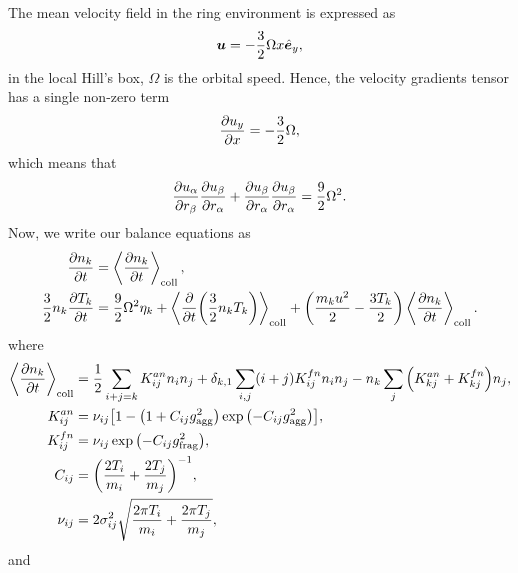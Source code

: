 \documentclass[aps,prl,preprint,groupedaddress,10pt]{revtex4-2}
\begin{document}
The mean velocity field in the ring environment is expressed as
\begin{equation}
    \vb*{u} = -\frac{3}{2}\Omega x\hat{\vb*{e}}_y,
\end{equation}
in the local Hill's box, $\Omega$ is the orbital speed.
Hence, the velocity gradients tensor has a single non-zero term
\begin{equation}
    \pdv{u_y}{x}=-\frac{3}{2}\Omega,
\end{equation}
which means that
\begin{equation}
    \pdv{{u}_{\alpha}}{{r}_{\beta}}\pdv{{u}_{\beta}}{{r}_{\alpha}}+\pdv{{u}_{\beta}}{{r}_{\alpha}}\pdv{{u}_{\beta}}{{r}_{\alpha}}=
    \frac{9}{2}\Omega^2.
\end{equation}
Now, we write our balance equations as
\begin{equation}
    \begin{split}
        \pdv{n_k}{t} &= \ltx{\avg{\pdv{n_k}{t}}}{coll},\\
        \frac{3}{2}n_k\pdv{T_k}{t} &=
        \frac{9}{2}\Omega^2\eta_k+
        \ltx{\avg{\pdv{t}\pqty{\frac{3}{2}n_kT_k}}}{coll}+
        \pqty{\frac{m_ku^2}{2}-\frac{3T_k}{2}}\ltx{\avg{\pdv{n_k}{t}}}{coll}.
    \end{split}
\end{equation}
where
\begin{equation}
    \begin{split}
        \ltx{\avg{\pdv{n_k}{t}}}{coll}&=\frac{1}{2}\sum_{i+j=k}K_{ij}^{an}n_in_j
        +\delta_{k,1}\sum_{i,j}(i+j)K^{fn}_{ij}n_in_j-n_k\sum_{j}
        \pqty{K_{kj}^{an}+K^{fn}_{kj}}n_j,\\
        K_{ij}^{an}&=\nu_{ij}\bqty{1-\pqty{1+C_{ij}\ltx{g}{agg}^2}
        \exp\pqty{-C_{ij}\ltx{g}{agg}^2}},\\
        K^{fn}_{ij}&=\nu_{ij}\exp\pqty{-C_{ij}\ltx{g}{frag}^2},\\
        C_{ij}&=\pqty{\frac{2T_i}{m_i}+\frac{2T_j}{m_j}}^{-1},\\
        \nu_{ij}&=2\sigma_{ij}^2\sqrt{\frac{2\pi T_i}{m_i}+\frac{2\pi T_j}{m_j}},
    \end{split}
\end{equation}
and
\end{document}
